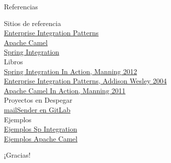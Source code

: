 \documentclass{beamer}
\begin{document}
\begin{frame}{Referencias}
\begin{center}
Sitios de referencia\\
\href{http://www.eaipatterns.com/}{Enterprise Integration Patterns} \\
\href{http://camel.apache.org/}{Apache Camel} \\
\href{http://projects.spring.io/spring-integration/}{Spring Integration} \\
Libros \\
\href{https://www.dropbox.com/s/gwa5p1edxpgudcz/Manning.Spring.Integration.in.Action.Sep.2012.pdf}{Spring Integration In Action, Manning 2012}  \\
\href{https://www.dropbox.com/s/zd9uft4ygbclehn/Addison.Wesley.Enterprise.Integration.Patterns.pdf}{Enterprise Integration Patterns, Addison Wesley 2004} \\
\href{https://www.dropbox.com/s/gjfegd85cvih78a/Manning.Camel.in.Action.Dec.2010.pdf}{Apache Camel In Action, Manning 2011} \\
Proyectos en Despegar \\
\href{http://gitlab.despegar.it/mail-checker/mail-checker}{mailSender en GitLab} \\
Ejemplos \\
\href{https://github.com/spring-projects/spring-integration-samples}{Ejemplos Sp Integration} \\
\href{http://camel.apache.org/examples.html}{Ejemplos Apache Camel}
\end{center}
\end{frame}

\begin{frame}{¡Gracias!}
\end{frame}
\end{document}
